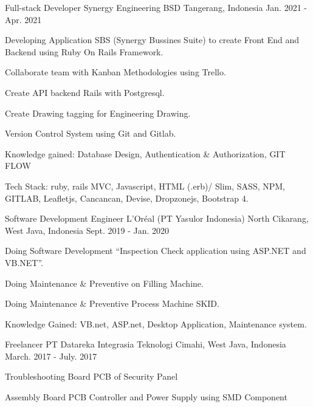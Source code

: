 \begin{cventries}
  \cventry
    {Full-stack Developer} %
    {Synergy Engineering} %
    {BSD Tangerang, Indonesia} %
    {Jan. 2021 - Apr. 2021} %
    {
      \begin{cvitems} %
        \item {Developing Application SBS (Synergy Bussines Suite) to create Front End and Backend using Ruby On Rails Framework.}
        \item {Collaborate team with Kanban Methodologies using Trello.}
        \item {Create API backend Rails with Postgresql.}
        \item {Create Drawing tagging for Engineering Drawing.}
        \item {Version Control System using Git and Gitlab.}
        \item {Knowledge gained: Database Design, Authentication \& Authorization, GIT FLOW}
        \item {Tech Stack: ruby, rails MVC, Javascript, HTML (.erb)/ Slim, SASS, NPM, GITLAB, Leafletjs, Cancancan, Devise, Dropzonejs, Bootstrap 4.}
      \end{cvitems}
    }

  \cventry
    {Software Development Engineer} %
    {L'Oréal (PT Yasulor Indonesia)} %
    {North Cikarang, West Java, Indonesia} %
    {Sept. 2019 - Jan. 2020} %
    {
      \begin{cvitems} %
        \item {Doing Software Development “Inspection Check application using ASP.NET and VB.NET”.}
        \item {Doing Maintenance \& Preventive on Filling Machine.}
        \item {Doing Maintenance \& Preventive Process Machine SKID.}
        \item {Knowledge Gained: VB.net, ASP.net, Desktop Application, Maintenance system.}
      \end{cvitems}
    }

  \cventry
    {Freelancer} %
    {PT Datareka Integrasia Teknologi}
    {Cimahi, West Java, Indonesia} %
    {March. 2017 - July. 2017} %
    {
      \begin{cvitems} %
        \item {Troubleshooting Board PCB of Security Panel}
        \item {Assembly Board PCB Controller and Power Supply using SMD Component}
      \end{cvitems}
    }


\end{cventries}
